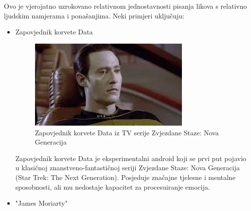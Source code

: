 \documentclass[diplomskirad]{fer}
\begin{document}
Ovo je vjerojatno uzrokovano relativnom jednostavnosti pisanja likova s relativno ljudskim namjerama i ponašanjima. Neki primjeri uključuju:

\begin{itemize}
\item Zapovjednik korvete Data

\begin{figure}[!h]
\centering
\includegraphics[width=8cm]{Figures/DataTNG.jpeg}
\caption{Zapovjednik korvete Data iz TV serije Zvjezdane Staze: Nova Generacija}
\label{fig:DataTNG}
\end{figure}

Zapovjednik korvete Data je eksperimentalni android koji se prvi put pojavio u klasičnoj znanstveno-fantastičnoj seriji Zvjezdane Staze: Nova Generacija (Star Trek: The Next Generation). Posjeduje značajne tjelesne i mentalne sposobnosti, ali mu nedostaje kapacitet za procesuiranje emocija.

\item "James Moriarty"


\end{itemize}
\end{document}
